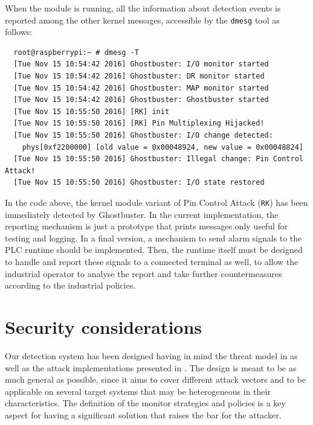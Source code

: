 When the module is running, all the information about detection events is reported among the other kernel messages, accessible by the \verb|dmesg| tool as follows:
\begin{Verbatim}
  root@raspberrypi:~ # dmesg -T
  [Tue Nov 15 10:54:42 2016] Ghostbuster: I/O monitor started
  [Tue Nov 15 10:54:42 2016] Ghostbuster: DR monitor started
  [Tue Nov 15 10:54:42 2016] Ghostbuster: MAP monitor started
  [Tue Nov 15 10:54:42 2016] Ghostbuster: Ghostbuster started
  [Tue Nov 15 10:55:50 2016] [RK] init
  [Tue Nov 15 10:55:50 2016] [RK] Pin Multiplexing Hijacked!
  [Tue Nov 15 10:55:50 2016] Ghostbuster: I/O change detected:
	phys[0xf2200000] [old value = 0x00048924, new value = 0x00048824]
  [Tue Nov 15 10:55:50 2016] Ghostbuster: Illegal change: Pin Control Attack!
  [Tue Nov 15 10:55:50 2016] Ghostbuster: I/O state restored
\end{Verbatim}
In the code above, the kernel module variant of Pin Control Attack (\verb|RK|) has been immediately detected by Ghostbuster.
In the current implementation, the reporting mechanism is just a prototype that prints messages only useful for testing and logging.
In a final version, a mechanism to send alarm signals to the PLC runtime should be implemented.
Then, the runtime itself must be designed to handle and report these signals to a connected terminal as well,
to allow the industrial operator to analyse the report and take further countermeasures according to the industrial policies.


\section{Security considerations}
\label{sec:def-sec}

Our detection system has been designed having in mind the threat model in  as well as the attack implementations presented in .
The design is meant to be as much general as possible, since it aims to cover different attack vectors and to be applicable
on several target systems that may be heterogeneous in their characteristics.
The definition of the monitor strategies and policies is a key aspect for having a significant solution that raises the bar for the attacker.


